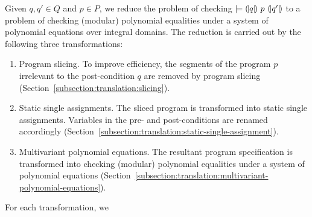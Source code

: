 
Given $q, q' \in Q$ and $p \in P$, we reduce the problem of checking
$\models {(\!|}{q}{|\!)}~{p}~{(\!|}{q'}{|\!)}$ to a problem of checking (modular)
polynomial equalities under a system of polynomial equations over
integral domains. The reduction is carried out by the following three
transformations:
\begin{enumerate}
\item Program slicing. To improve efficiency, the segments of the program $p$
  irrelevant to the post-condition $q$ are removed by program slicing 
  (Section~\ref{subsection:translation:slicing}). 
\item Static single assignments. The sliced program is transformed
  into static single assignments. Variables in the pre- and
  post-conditions are renamed accordingly
  (Section~\ref{subsection:translation:static-single-assignment}).
\item Multivariant polynomial equations. The resultant program
  specification is transformed into checking (modular)
  polynomial equalities under a system of polynomial equations
  (Section~\ref{subsection:translation:multivariant-polynomial-equations}).
\end{enumerate}

For each transformation, we 